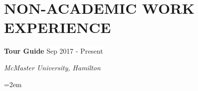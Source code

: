 \documentclass[paper=a4,fontsize=11pt]{scrartcl}	 			%
\newcommand{\NewPart}[1]{\section*{\uppercase{#1}}}
\newcommand{\EducationEntry}[4]{
		\noindent \textbf{#1} \hfill 					%
		\colorbox{White}{%
			\parbox{10em}{%
			\hfill\color{Black}#2}} \par				%
		\noindent \textit{#3} \par					%
		\noindent\hangindent=2em\hangafter=0 \small #4 	%
		\normalsize \par}
\newcommand{\WorkEntry}[4]{						%
		\noindent \textbf{#1} \hfill 					%
		\colorbox{White}{\color{Black}#2} \par		%
		\noindent \textit{#3} \par					%
		\noindent\hangindent=2em\hangafter=0 \small #4 	%
		\normalsize \par}
\newcommand{\RefEntry}[7]{						%
		\noindent \textbf{#1} \par 					%
		\noindent \textit{#2} \par	%
		\noindent \textit{#3} \par
		\noindent \textit{#4} \par%
		\noindent \textit{#5} \par
		\noindent \textit{#6} \par
		\noindent \textit{#7} \par
		}
\begin{document}
%
%
%
\NewPart{Non-Academic Work Experience}{}
\WorkEntry{Tour Guide}{Sep 2017 - Present}{McMaster University, Hamilton}{}
\end{document}
